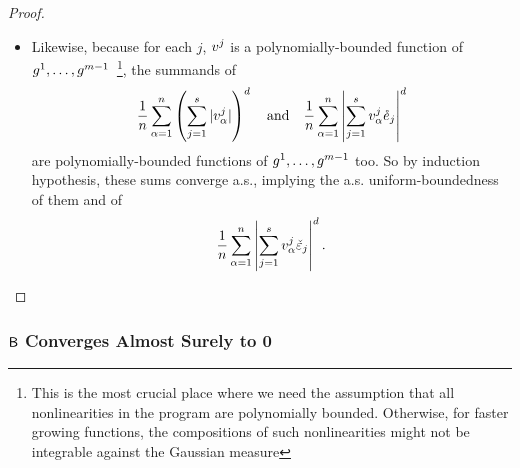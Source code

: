 \documentclass[main.tex]{subfiles}
\begin{document}
\begin{proof}
\begin{itemize}
          almost surely, for large enough $n$, $|\sum_{i=1}^r \xme_\alpha^i \varepsilonhat_i| \le \sum_{i=1}^r |\xme_\alpha^i|$ (again, the order of qualifier is very important here).
          By induction hypothesis,
          \begin{align*}
          \f 1 n \sum_{\alpha=1}^n
              \lp \sum_{i=1}^r |\xme_\alpha^i|\rp^d
          \end{align*}
          converges a.s.\ to a deterministic value, yielding the a.s.\ uniform-boundedness of it and of
          \begin{align*}
          \f 1 n \sum_{\alpha=1}^n
              \left| \sum_{i=1}^r \xme_\alpha^i \varepsilonhat_i \right|^d.
          \end{align*}
      \item
          Likewise, because for each $j$, $v^j$ is a polynomially-bounded function of $g^1, \ldots, g^{m-1}$\ \footnote{This is the most crucial place where we need the assumption that all nonlinearities in the program are polynomially bounded. Otherwise, for faster growing functions, the compositions of such nonlinearities might not be integrable against the Gaussian measure}, the summands of
          \begin{align*}
          \frac{1}{n} \sum_{\alpha=1}^n
              \left( \sum_{j=1}^s |v_\alpha^j|\right)^d
          \quad\text{and}\quad
          \frac{1}{n} \sum_{\alpha=1}^n
                      \left|
                          \sum_{j=1}^s
                          v_\alpha^j \mathring{e}_j
                      \right|^d
          \end{align*}
          are polynomially-bounded functions of $g^1, \ldots, g^{m-1}$ too.
          So by induction hypothesis, these sums converge a.s., implying the a.s. uniform-boundedness of them and of
          \begin{align*}
          \frac{1}{n} \sum_{\alpha=1}^n
                      \left|
                          \sum_{j=1}^s
                          v_\alpha^j \check\varepsilon_j
                      \right|^d
              .
         \end{align*}
  \end{itemize}
\end{proof}

\subsubsection{\texorpdfstring{$\mathsf{B}$}{B} Converges Almost Surely to 0}
\label{sec:probB}
\newcommand{\JJc}{J}
\newcommand{\JJ}{\bar{\JJc}}
\end{document}
